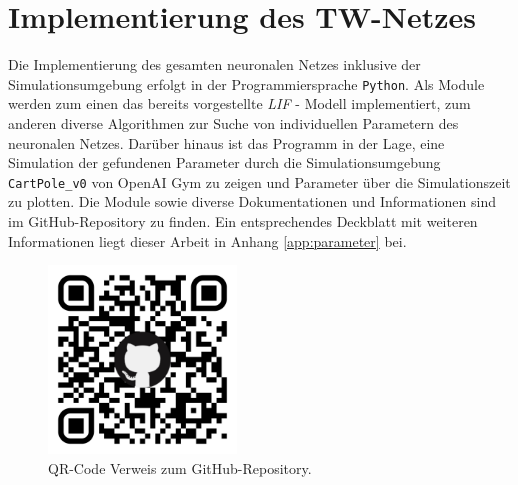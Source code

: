 %
\chapter{Implementierung des TW-Netzes}
\label{chap:imp}
%

	\begin{minipage}[b]{0.65\textwidth}
		Die Implementierung des gesamten neuronalen Netzes inklusive der Simulationsumgebung erfolgt in der Programmiersprache \texttt{Python}. Als Module werden zum einen das bereits vorgestellte \textit{LIF} - Modell implementiert, zum anderen diverse Algorithmen zur Suche von individuellen Parametern des neuronalen Netzes. Darüber hinaus ist das Programm in der Lage, eine Simulation der gefundenen Parameter durch die Simulationsumgebung \texttt{CartPole\_v0} von OpenAI Gym \cite{Brockman2016} zu zeigen und Parameter über die Simulationszeit zu plotten. Die Module sowie diverse Dokumentationen und Informationen sind im GitHub-Repository\footnotemark{} zu finden. Ein entsprechendes Deckblatt mit weiteren Informationen liegt dieser Arbeit in Anhang \ref{app:parameter} bei.
	\end{minipage}
	\begin{minipage}[b]{0.35\textwidth}
		\begin{figure}[H] %
			\centering
			\includegraphics[width=5cm]{figures/appendix/qr-code.pdf}
			\caption{QR-Code Verweis zum GitHub-Repository.}
			\label{fig:qr}
		\end{figure}
	\end{minipage}
		

